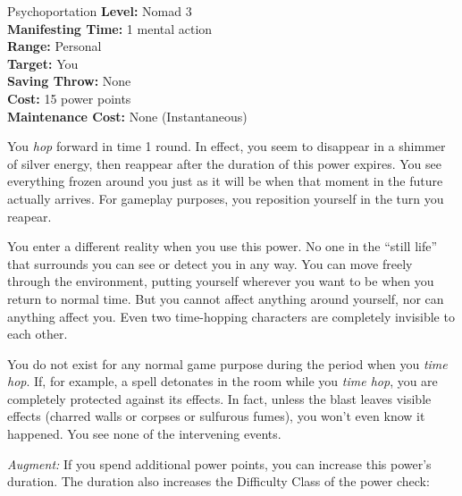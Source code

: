 {Psychoportation}
{
	\textbf{Level:}
	Nomad 3\\
	\textbf{Manifesting Time:}
	1 mental action\\
	\textbf{Range:}
	Personal\\
	\textbf{Target:}
	You\\
	\textbf{Saving Throw:}
	None\\
	\textbf{Cost:}
	15 power points\\
	\textbf{Maintenance Cost:}
	None (Instantaneous)\\
}
{
	You \emph{hop} forward in time 1 round. In effect, you seem to disappear in a shimmer of silver energy, then reappear after the duration of this power expires. You see everything frozen around you just as it will be when that moment in the future actually arrives. For gameplay purposes, you reposition yourself in the turn you reapear.

	You enter a different reality when you use this power. No one in the ``still life'' that surrounds you can see or detect you in any way. You can move freely through the environment, putting yourself wherever you want to be when you return to normal time. But you cannot affect anything around yourself, nor can anything affect you. Even two time-hopping characters are completely invisible to each other. 

	You do not exist for any normal game purpose during the period when you \emph{time hop}. If, for example, a  spell detonates in the room while you \emph{time hop}, you are completely protected against its effects. In fact, unless the blast leaves visible effects (charred walls or corpses or sulfurous fumes), you won't even know it happened. You see none of the intervening events.

	\textit{Augment:} If you spend additional power points, you can increase this power's duration. The duration also increases the Difficulty Class of the power check:

}
